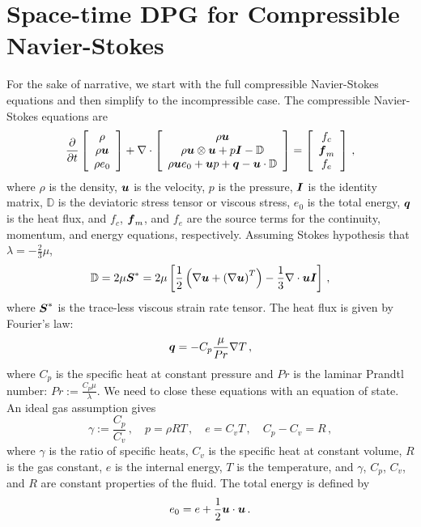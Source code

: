 \documentclass[Proposal.tex]{subfiles}
\begin{document}
\section{Space-time DPG for Compressible Navier-Stokes}
For the sake of narrative, we start with the full compressible Navier-Stokes equations and then simplify to the incompressible case.
The compressible Navier-Stokes equations are
\begin{align}
\frac{\partial}{\partial t}\left[ \begin{array}{c} \rho\\ \rho\boldsymbol u\\ \rho e_0\\ \end{array} \right]
+\nabla\cdot\left[ \begin{array}{c} \rho\boldsymbol u\\ \rho\boldsymbol u\otimes\boldsymbol u+p\boldsymbol I-\mathbb{D}\\ \rho\boldsymbol u e_0+\boldsymbol u p+\boldsymbol q-\boldsymbol u\cdot\mathbb{D}\\ \end{array} \right]
=\left[ \begin{array}{c} f_c\\ \boldsymbol f_m\\ f_e\\ \end{array} \right]\,,
\end{align}
where $\rho$ is the density, $\boldsymbol u$ is the velocity, $p$ is the pressure, $\boldsymbol I$ is the identity matrix,
$\mathbb{D}$ is the deviatoric stress tensor or viscous stress, $e_0$ is the total energy, $\boldsymbol q$ is the heat flux, 
and $f_c$, $\boldsymbol f_m$, and $f_e$ are the source terms for the continuity, momentum, and energy equations, respectively.
Assuming Stokes hypothesis that $\lambda=-\frac{2}{3}\mu$, 
\begin{equation*}
	\mathbb{D}=2\mu\boldsymbol S^*=2\mu\left[ \frac{1}{2}\left( \nabla\boldsymbol u+\left( \nabla\boldsymbol u \right)^T \right)-\frac{1}{3}\nabla\cdot\boldsymbol u\boldsymbol I \right]\,,
\end{equation*}
where $\boldsymbol S^*$ is the trace-less viscous strain rate tensor.
The heat flux is given by Fourier's law:
\begin{equation*}
	\boldsymbol q=-C_p\frac{\mu}{Pr}\nabla T\,,
\end{equation*}
where $C_p$ is the specific heat at constant pressure and $Pr$ is the laminar Prandtl number: $Pr:=\frac{C_p\mu}{\lambda}$.
We need to close these equations with an equation of state. An ideal gas assumption gives
\begin{equation*}
	\gamma:=\frac{C_p}{C_v}\,,\quad p=\rho RT\,,\quad e=C_v T\,,\quad C_p-C_v=R\,,
\end{equation*}
where $\gamma$ is the ratio of specific heats, $C_v$ is the specific heat at constant volume, $R$ is the gas constant,
$e$ is the internal energy, $T$ is the temperature,
and $\gamma$, $C_p$, $C_v$, and $R$ are constant properties of the fluid.
The total energy is defined by
\begin{equation*}
	e_0=e+\frac{1}{2}\boldsymbol u\cdot\boldsymbol u\,.
\end{equation*}
\end{document}
